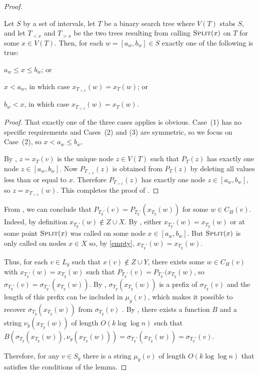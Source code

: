 \documentclass[kpfonts]{patmorin}
\let\le\leqslant
\begin{document}
\begin{proof}
  \begin{clm}
    Let $S$ by a set of intervals, let $T$ be a binary search tree where $V(T)$ stabs $S$, and let $T_{<x}$ and $T_{>x}$ be the two trees resulting from calling $\textsc{Split}(x)$ on $T$ for some $x\in V(T)$.  Then, for each $w=[a_w,b_w]\in S$ exactly one of the following is true:
    \begin{compactenum}
      \item $a_w\le x\le b_w$; or
      \item $x< a_w$, in which case $x_{T_{>x}}(w)=x_T(w)$; or
      \item $b_w < x$, in which case $x_{T_{<x}}(w)=x_T(w)$.
    \end{compactenum}
  \end{clm}

  \begin{proof}
    That exactly one of the three cases applies is obvious.  Case~(1) has no specific requirements and Cases~(2) and (3) are symmetric, so we focus on Case~(2), so $x < a_w\le b_w$.
    
    By , $z=x_T(v)$ is the unique node $z\in V(T)$ such that $P_T(z)$ has exactly one node $z\in [a_w,b_w]$.  Now $P_{T_{>x}}(z)$ is obtained from $P_T(z)$ by deleting all values less than or equal to $x$. Therefore $P_{T_{>x}}(z)$ has exactly one node $z\in[a_w,b_w]$, so $z=x_{T_{>x}}(w)$.  This completes the proof of .
  \end{proof}
  
  From , we can conclude that $P_{T_y'}(v)=P_{T_y'}(x_{T_y}(w))$ for some $w\in C_H(v)$.  Indeed, by definition $x_{T_y'}(w)\not\in Z\cup X$. By , either $x_{T_y'}(w)=x_{T_y}(w)$ or at some point $\textsc{Split}(x)$ was called on some node $x\in[a_w,b_w]$.  But $\textsc{Split}(x)$ is only called on nodes $x\in X$ so, by \eqref{empty}, $x_{T_y'}(w)=x_{T_y}(w)$.
  
  Thus, for each $v\in L_y$ such that $x(v)\not\in Z\cup Y$, there exists some $w\in C_H(v)$ with $x_{T_y'}(w)=x_{T_y}(w)$ such that $P_{T_y'}(v)=P_{T_y'}(x_{T_y}(w)$, so $\sigma_{T_y'}(v)=\sigma_{T_y'}(x_{T_y}(w))$.  By , $\sigma_{T_y}(x_{T_y}(w))$ is a prefix of $\sigma_{T_y}(v)$ and the length of this prefix can be included in $\mu_y(v)$, which makes it possible to recover $\sigma_{T_y}(x_{T_y}(w))$ from $\sigma_{T_y}(v)$ .  By , there exists a function $B$ and a string $\nu_y(x_{T_y}(w))$ of length $O(k\log\log n)$ such that $B(\sigma_{T_y}(x_{T_y}(w)), \nu_y(x_{T_y}(w))) = \sigma_{T_y'}(x_{T_y}(w)) = \sigma_{T_y'}(v)$.
  
  Therefore, for any $v\in S_y$ there is a string $\mu_y(v)$ of length $O(k\log\log n)$ that satisfies the conditions of the lemma.
\end{proof}
  
\end{document}
